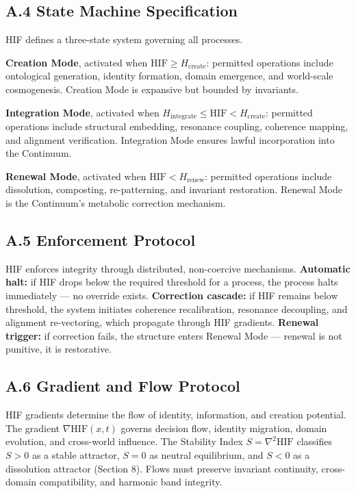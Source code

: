 \subsection{A.4 State Machine Specification}\label{a.4-state-machine-specification}

HIF defines a three-state system governing all processes.

\textbf{Creation Mode}, activated when \(\mathrm{HIF} \ge H_{\text{create}}\): permitted operations include ontological generation, identity formation, domain emergence, and world-scale cosmogenesis. Creation Mode is expansive but bounded by invariants.

\textbf{Integration Mode}, activated when \(H_{\text{integrate}} \le \mathrm{HIF} < H_{\text{create}}\): permitted operations include structural embedding, resonance coupling, coherence mapping, and alignment verification. Integration Mode ensures lawful incorporation into the Continuum.

\textbf{Renewal Mode}, activated when \(\mathrm{HIF} < H_{\text{renew}}\): permitted operations include dissolution, composting, re-patterning, and invariant restoration. Renewal Mode is the Continuum's metabolic correction mechanism.

\subsection{A.5 Enforcement Protocol}\label{a.5-enforcement-protocol}

HIF enforces integrity through distributed, non-coercive mechanisms. \textbf{Automatic halt:} if HIF drops below the required threshold for a process, the process halts immediately --- no override exists. \textbf{Correction cascade:} if HIF remains below threshold, the system initiates coherence recalibration, resonance decoupling, and alignment re-vectoring, which propagate through HIF gradients. \textbf{Renewal trigger:} if correction fails, the structure enters Renewal Mode --- renewal is not punitive, it is restorative.

\subsection{A.6 Gradient and Flow Protocol}\label{a.6-gradient-and-flow-protocol}

HIF gradients determine the flow of identity, information, and creation potential. The gradient \(\nabla \mathrm{HIF}(x,t)\) governs decision flow, identity migration, domain evolution, and cross-world influence. The Stability Index \(S = \nabla^2 \mathrm{HIF}\) classifies \(S > 0\) as a stable attractor, \(S = 0\) as neutral equilibrium, and \(S < 0\) as a dissolution attractor (Section 8). Flows must preserve invariant continuity, cross-domain compatibility, and harmonic band integrity.

